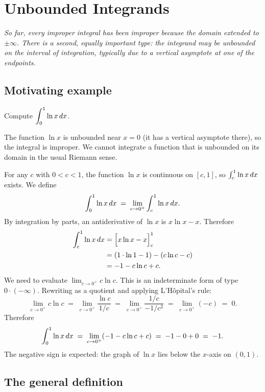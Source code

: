 \section{Unbounded Integrands}
\label{sec:12.5}

\textit{So far, every improper integral has been improper because the domain extended to $\pm\infty$.  There is a second, equally important type: the integrand may be unbounded on the interval of integration, typically due to a vertical asymptote at one of the endpoints.}

\subsection*{Motivating example}

\begin{example}
\label{ex:12-4}
Compute $\displaystyle\int_{0}^{1}\ln x\,dx$.

The function $\ln x$ is unbounded near $x=0$ (it has a vertical asymptote there), so the integral is improper.  We cannot integrate a function that is unbounded on its domain in the usual Riemann sense.

For any $c$ with $0<c<1$, the function $\ln x$ is continuous on $[c,1]$, so $\int_{c}^{1}\ln x\,dx$ exists.  We define
\[
  \int_{0}^{1}\ln x\,dx
  \;=\; \lim_{c\to 0^{+}}\int_{c}^{1}\ln x\,dx.
\]
By integration by parts, an antiderivative of $\ln x$ is $x\ln x - x$.  Therefore
\begin{align*}
  \int_{c}^{1}\ln x\,dx
  &= \Bigl[x\ln x - x\Bigr]_{c}^{1} \\
  &= (1\cdot\ln 1 - 1) - (c\ln c - c) \\
  &= -1 - c\ln c + c.
\end{align*}
We need to evaluate $\lim_{c\to 0^{+}}c\ln c$.  This is an indeterminate form of type $0\cdot(-\infty)$.  Rewriting as a quotient and applying L'H\^opital's rule:
\[
  \lim_{c\to 0^{+}}c\ln c
  \;=\; \lim_{c\to 0^{+}}\frac{\ln c}{1/c}
  \;=\; \lim_{c\to 0^{+}}\frac{1/c}{-1/c^{2}}
  \;=\; \lim_{c\to 0^{+}}(-c)
  \;=\; 0.
\]
Therefore
\[
  \int_{0}^{1}\ln x\,dx
  \;=\; \lim_{c\to 0^{+}}(-1 - c\ln c + c)
  \;=\; -1 - 0 + 0
  \;=\; -1.
\]
The negative sign is expected: the graph of $\ln x$ lies below the $x$-axis on $(0,1)$.
\end{example}

\subsection*{The general definition}

